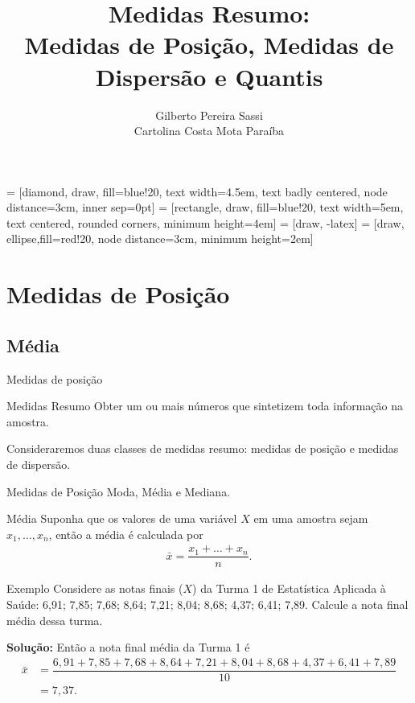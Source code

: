 \documentclass[8pt]{beamer}
\date{}
\title[Medidas Resumo]{Medidas Resumo: \\ Medidas de Posição, Medidas de Dispersão e Quantis}
\author[Gilberto  e Carolina]{Gilberto Pereira Sassi\\
	Cartolina Costa Mota Paraíba}
\institute[IME -- UFBA]{Universidade Federal da Bahia \\ Instituto de Matem\'{a}tica e Estat\'{i}stica\\ Departamento de Estat\'{i}stica }
\begin{document}
	
 = [diamond, draw, fill=blue!20, 
text width=4.5em, text badly centered, node distance=3cm, inner sep=0pt]
 = [rectangle, draw, fill=blue!20, 
text width=5em, text centered, rounded corners, minimum height=4em]
 = [draw, -latex]
 = [draw, ellipse,fill=red!20, node distance=3cm,
minimum height=2em]
	
\begin{frame}{}
	\maketitle
\end{frame}

\section{Medidas de Posição}

\subsection{Média}

\begin{frame}{Medidas de posição}
  \begin{block}{Medidas Resumo}
   Obter um ou mais números que sintetizem toda informação na amostra. 
   
   Consideraremos duas classes de medidas resumo: medidas de posição e medidas de dispersão.
  \end{block}

  \begin{block}{Medidas de Posição}
   Moda, Média e Mediana.
  \end{block}
  
  \begin{block}{Média}
    Suponha que os valores de uma variável $X$ em uma amostra sejam $x_1, \dots, x_n$, então a média é calculada por
    \begin{align*}
     \bar{x} = \dfrac{x_1+ \dots + x_n}{n}.
   \end{align*}
  \end{block}
\end{frame}

\begin{frame}{Exemplo}
   Considere as notas finais ($X$) da Turma 1 de Estatística Aplicada à Saúde: 6,91; 7,85; 7,68; 8,64; 7,21; 8,04; 8,68; 4,37; 6,41; 7,89. Calcule a nota final média dessa turma.
   \vfill
   
   \textbf{Solução:} Então a nota final média da Turma 1 é 
   \begin{align*}
    \bar{x} &= \dfrac{6,91 +7,85+ 7,68+ 8,64+ 7,21+ 8,04+ 8,68+ 4,37+ 6,41+ 7,89}{10}\\
    &= 7,37.
   \end{align*}

\end{frame}
\end{document}
